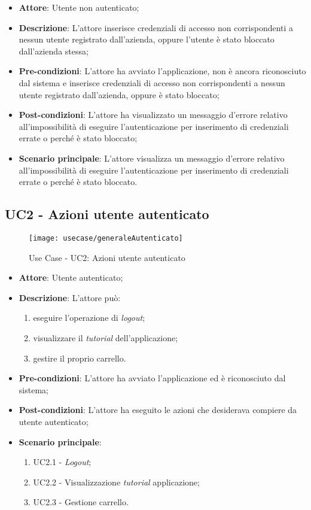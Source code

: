 \begin{itemize}
	\item \textbf{Attore}: Utente non autenticato;
	\item \textbf{Descrizione}: L'attore inserisce credenziali di accesso non corrispondenti a nessun utente registrato dall'azienda, oppure l'utente è stato bloccato dall'azienda stessa;
	\item \textbf{Pre-condizioni}: L'attore ha avviato l'applicazione, non è ancora riconosciuto dal sistema e inserisce credenziali di accesso non corrispondenti a nessun utente registrato dall'azienda, oppure è stato bloccato;
	\item \textbf{Post-condizioni}: L'attore ha visualizzato un messaggio d'errore relativo all'impossibilità di eseguire l'autenticazione per inserimento di credenziali errate o perché è stato bloccato;
	\item \textbf{Scenario principale}: L'attore visualizza un messaggio d'errore relativo all'impossibilità di eseguire l'autenticazione per inserimento di credenziali errate o perché è stato bloccato.
\end{itemize}

\newpage

\subsection{UC2 - Azioni utente autenticato}

\begin{figure}[!h] 
    \centering 
    \texttt{[image: usecase/generaleAutenticato]} 
    \caption{Use Case - UC2: Azioni utente autenticato}
\end{figure}

\begin{itemize}
	\item \textbf{Attore}: Utente autenticato;
	\item \textbf{Descrizione}: L'attore può:
	\begin{enumerate}
		\item eseguire l'operazione di \textit{logout};
		\item visualizzare il \textit{tutorial} dell'applicazione;
		\item gestire il proprio carrello. 
	\end{enumerate}
	\item \textbf{Pre-condizioni}: L'attore ha avviato l'applicazione ed è riconosciuto dal sistema;
	\item \textbf{Post-condizioni}: L'attore ha eseguito le azioni che desiderava compiere da utente autenticato;
	\item \textbf{Scenario principale}: 
		\begin{enumerate}
			\item UC2.1 - \textit{Logout};
			\item UC2.2 - Visualizzazione \textit{tutorial} applicazione;
			\item UC2.3 - Gestione carrello.
		\end{enumerate}
\end{itemize}

